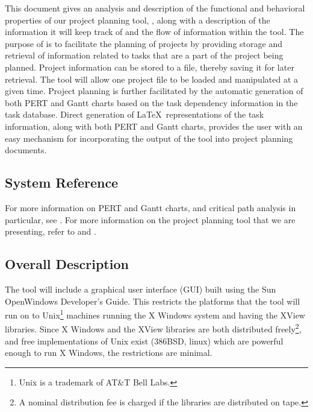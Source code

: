 This document gives an analysis and description of the functional and
behavioral properties of our project planning tool, \xplan, along
with a description of the information it will keep track of and the
flow of information within the tool.  The purpose of \xplan\/ is to
facilitate the planning of projects by providing storage and retrieval
of information related to tasks that are a part of the project being
planned.  Project information can be stored to a file, thereby saving
it for later retrieval.  The tool will allow one project file to be
loaded and manipulated at a given time.  Project planning is further
facilitated by the automatic generation of both PERT and Gantt charts
based on the task dependency information in the task database.  Direct
generation of \LaTeX\ representations of the task information, along
with both PERT and Gantt charts, provides the user with an easy
mechanism for incorporating the output of the tool into project
planning documents.

%
%
\subsection{System Reference}

For more information on PERT and Gantt charts, and critical path
analysis in particular, see \cite{cpa}.  For more information on the
project planning tool that we are presenting, refer to \cite{prj-desc}
and \cite{prj-plan}.

%
%
\subsection{Overall Description}

The tool will include a graphical user interface (GUI) built using the
Sun OpenWindows Developer's Guide.  This restricts the platforms that
the tool will run on to Unix\footnote{Unix is a trademark of AT\&T
Bell Labs.} machines running the X Windows system and having the XView
libraries.  Since X Windows and the XView libraries are both
distributed freely\footnote{A nominal distribution fee is charged if
the libraries are distributed on tape.}, and free implementations of
Unix exist (386BSD, linux) which are powerful enough to run X Windows,
the restrictions are minimal.

